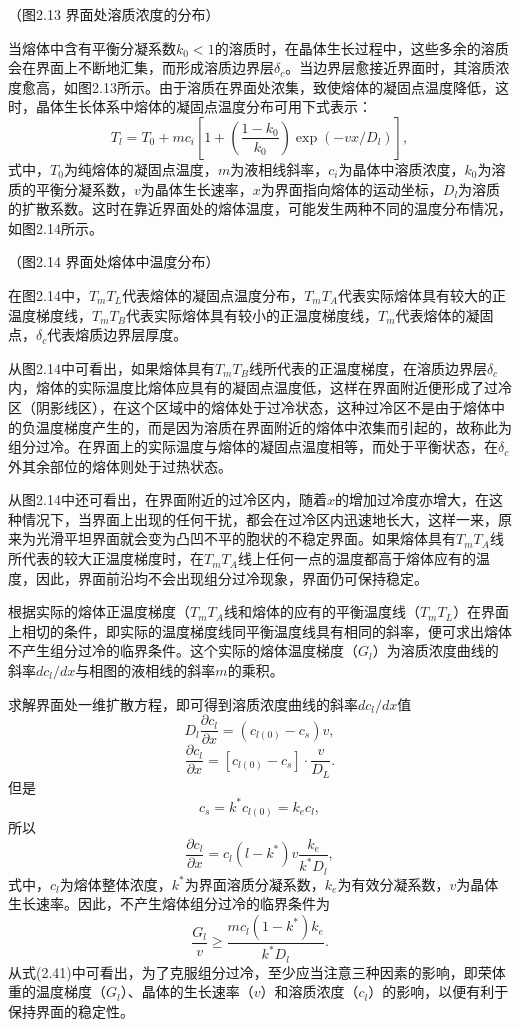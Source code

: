（图2.13 界面处溶质浓度的分布）

当熔体中含有平衡分凝系数$k_0<1$的溶质时，在晶体生长过程中，这些多余的溶质会在界面上不断地汇集，而形成溶质边界层$\delta_c$。当边界层愈接近界面时，其溶质浓度愈高，如图2.13所示。由于溶质在界面处浓集，致使熔体的凝固点温度降低，这时，晶体生长体系中熔体的凝固点温度分布可用下式表示：
\begin{equation}
T_l=T_0+mc_i\left[1+\left(\frac{1-k_0}{k_0}\right)\exp(-vx/D_l)\right],
\end{equation}
式中，$T_0$为纯熔体的凝固点温度，$m$为液相线斜率，$c_i$为晶体中溶质浓度，$k_0$为溶质的平衡分凝系数，$v$为晶体生长速率，$x$为界面指向熔体的运动坐标，$D_l$为溶质的扩散系数。这时在靠近界面处的熔体温度，可能发生两种不同的温度分布情况，如图2.14所示。

（图2.14 界面处熔体中温度分布）

在图2.14中，$T_mT_L$代表熔体的凝固点温度分布，$T_mT_A$代表实际熔体具有较大的正温度梯度线，$T_mT_B$代表实际熔体具有较小的正温度梯度线，$T_m$代表熔体的凝固点，$\delta_c$代表熔质边界层厚度。

从图2.14中可看出，如果熔体具有$T_mT_B$线所代表的正温度梯度，在溶质边界层$\delta_c$内，熔体的实际温度比熔体应具有的凝固点温度低，这样在界面附近便形成了过冷区（阴影线区），在这个区域中的熔体处于过冷状态，这种过冷区不是由于熔体中的负温度梯度产生的，而是因为溶质在界面附近的熔体中浓集而引起的，故称此为组分过冷。在界面上的实际温度与熔体的凝固点温度相等，而处于平衡状态，在$\delta_c$外其余部位的熔体则处于过热状态。

从图2.14中还可看出，在界面附近的过冷区内，随着$x$的增加过冷度亦增大，在这种情况下，当界面上出现的任何干扰，都会在过冷区内迅速地长大，这样一来，原来为光滑平坦界面就会变为凸凹不平的胞状的不稳定界面。如果熔体具有$T_mT_A$线所代表的较大正温度梯度时，在$T_mT_A$线上任何一点的温度都高于熔体应有的温度，因此，界面前沿均不会出现组分过冷现象，界面仍可保持稳定。

根据实际的熔体正温度梯度（$T_mT_A$线和熔体的应有的平衡温度线（$T_mT_L$）在界面上相切的条件，即实际的温度梯度线同平衡温度线具有相同的斜率，便可求出熔体不产生组分过冷的临界条件。这个实际的熔体温度梯度（$G_l$）为溶质浓度曲线的斜率$dc_l/dx$与相图的液相线的斜率$m$的乘积。

求解界面处一维扩散方程，即可得到溶质浓度曲线的斜率$dc_l/dx$值
$$D_l\frac{\partial c_l}{\partial x}=(c_{l(0)}-c_s)v,$$
\begin{equation}
\frac{\partial c_l}{\partial x}=[c_{l(0)}-c_s]\cdot\frac{v}{D_L}.
\end{equation}
但是
$$c_s=k^*c_{l(0)}=k_ec_l,$$
所以
$$\frac{\partial c_l}{\partial x}=c_l(l-k^*)v\frac{k_e}{k^*D_l},$$
式中，$c_l$为熔体整体浓度，$k^*$为界面溶质分凝系数，$k_e$为有效分凝系数，$v$为晶体生长速率。因此，不产生熔体组分过冷的临界条件为
\begin{equation}
\frac{G_l}{v}\geq\frac{mc_l(1-k^*)k_e}{k^*D_l}.
\end{equation}
从式(2.41)中可看出，为了克服组分过冷，至少应当注意三种因素的影响，即荣体重的温度梯度（$G_l$）、晶体的生长速率（$v$）和溶质浓度（$c_l$）的影响，以便有利于保持界面的稳定性。

